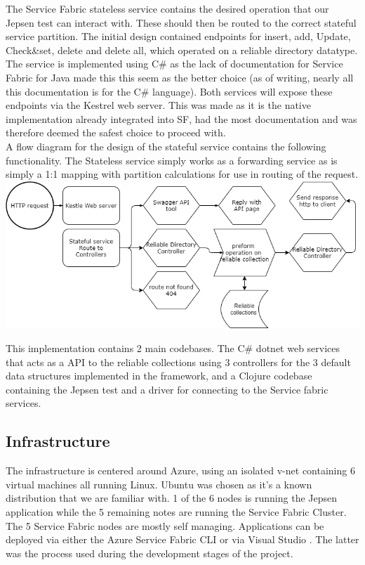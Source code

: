 \documentclass[a4paper,10pt,titlepage]{report}
\begin{document}
    The Service Fabric stateless service contains the desired operation that our Jepsen test can interact with. These should then be routed to the correct stateful service partition. The initial design contained endpoints for insert, add, Update, Check\&set, delete and delete all, which operated on a reliable directory datatype. The service is implemented using C\# as the lack of documentation for Service Fabric for Java made this this seem as the better choice (as of writing, nearly all this documentation is for the C\# language). Both services will expose these endpoints via the Kestrel web server. This was made as it is the native implementation already integrated into SF, had the most documentation and was therefore deemed the safest choice to proceed with.\\
    \vspace{5mm}
    A flow diagram for the design of the stateful service contains the following functionality. The Stateless service simply works as a forwarding service as is simply a 1:1 mapping with partition calculations for use in routing of the request. \\
    \vspace{5mm}
    \includegraphics[scale=0.5]{images/Design_Stateful_service_1.0.drawio.png}

    This implementation contains 2 main codebases. The C\# dotnet web services that acts as a API to the reliable collections using 3 controllers for the 3 default data structures implemented in the framework, and a Clojure codebase containing the Jepsen test and a driver for connecting to the Service fabric services.

    \subsection{Infrastructure}
    The infrastructure is centered around Azure, using an isolated v-net containing 6 virtual machines all running Linux. Ubuntu was chosen as it's a known distribution that we are familiar with. 1 of the 6 nodes is running the Jepsen application while the 5 remaining notes are running the Service Fabric Cluster.
    The 5 Service Fabric nodes are mostly self managing. Applications can be deployed via either the Azure Service Fabric CLI \cite{servicefabriccli} or via Visual Studio \cite{servicefabricguide}. The latter was the process used during the development stages of the project.
\end{document}
